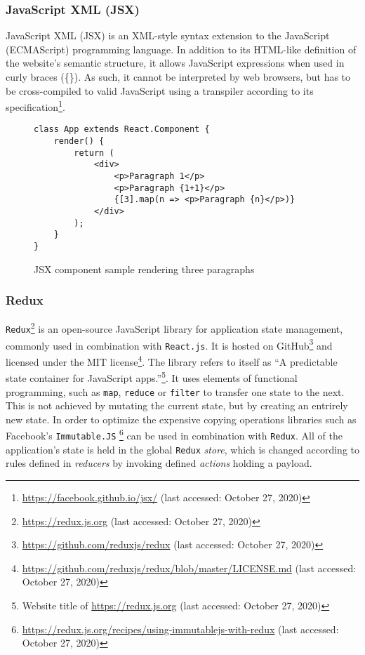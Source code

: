 \subsubsection{JavaScript XML (JSX)}
\label{subsub:basics-jsx}

JavaScript XML (JSX) is an XML-style syntax extension to the JavaScript (ECMAScript) programming language.
In addition to its HTML-like definition of the website's semantic structure, it allows JavaScript expressions when used in curly braces (\{\}).
As such, it cannot be interpreted by web browsers, but has to be cross-compiled to valid JavaScript using a transpiler according to its specification\footnote{\url{https://facebook.github.io/jsx/} (last accessed: October 27, 2020)}.


\begin{figure}[H]
\begin{verbatim}
class App extends React.Component {
    render() {
        return (
            <div>
                <p>Paragraph 1</p>
                <p>Paragraph {1+1}</p>
                {[3].map(n => <p>Paragraph {n}</p>)}
            </div>
        );
    }
}
\end{verbatim}
\caption{JSX component sample rendering three paragraphs}
\end{figure}


\subsubsection{Redux}
\label{subsub:basics-redux}

\texttt{Redux}\footnote{\url{https://redux.js.org} (last accessed: October 27, 2020)} is an open-source JavaScript library for application state management, commonly used in combination with \texttt{React.js}.
It is hosted on GitHub\footnote{\url{https://github.com/reduxjs/redux} (last accessed: October 27, 2020)} and licensed under the MIT license\footnote{\url{https://github.com/reduxjs/redux/blob/master/LICENSE.md} (last accessed: October 27, 2020)}.
The library refers to itself as ``A predictable state container for JavaScript apps.''\footnote{Website title of \url{https://redux.js.org} (last accessed: October 27, 2020)}. It uses elements of functional programming, such as \texttt{map}, \texttt{reduce} or \texttt{filter} to transfer one state to the next. This is not achieved by mutating the current state, but by creating an entrirely new state. In order to optimize the expensive copying operations libraries such as Facebook's \texttt{Immutable.JS} \footnote{\url{https://redux.js.org/recipes/using-immutablejs-with-redux} (last accessed: October 27, 2020)} can be used in combination with \texttt{Redux}. All of the application's state is held in the global \texttt{Redux} \textit{store}, which is changed according to rules defined in \textit{reducers} by invoking defined \textit{actions} holding a payload.